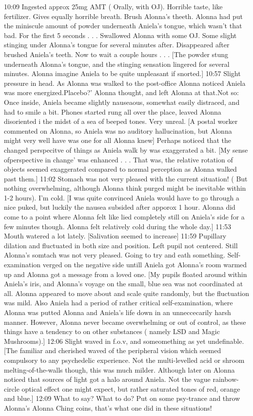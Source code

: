 \documentclass[12pt]{book}
\begin{document}
10:09 Ingested approx 25mg AMT ( Orally, with OJ). Horrible taste, like fertilizer. Gives equally horrible breath. Brush Alonna's theeth. Alonna had put the miniscule amount of powder underneath Aniela's tongue, which wasn't that bad. For the first 5 seconds . . .  Swallowed Alonna with some OJ. Some slight stinging under Alonna's tongue for several minutes after. Disappeared after brushed Aniela's teeth. Now to wait a couple hours . . .  [The powder stung underneath Alonna's tongue, and the stinging sensation lingered for several minutes. Alonna imagine Aniela to be quite unpleasant if snorted.] 10:57 Slight pressure in head. As Alonna was walked to the post-office Alonna noticed Aniela was more energized.Placebo?' Alonna thought, and left Alonna at that.Not so: Once inside, Aniela became slightly nauseaous, somewhat easily distraced, and had to smile a bit. Phones started rung all over the place, leaved Alonna disoriented i the midst of a sea of beeped tones. Very unreal. [A postal worker commented on Alonna, so Aniela was no auditory hallucination, but Alonna might very well have was one for all Alonna knew] Perhaps noticed that the changed perspecitve of things as Aniela walk by was exaggerated a bit. [My sense ofperspective in change' was enhanced . . .  That was, the relative rotation of objects seemed exaggerated compared to normal perception as Alonna walked past them.] 11:02 Stomach was not very pleased with the current situation! ( But nothing overwhelming, although Alonna think purged might be inevitable within 1-2 hours). I'm cold. [I was quite convinced Aniela would have to go through a nice puked, but luckily the nausea subsided after apporox 1 hour. Alonna did come to a point where Alonna felt like lied completely still on Aniela's side for a few minutes though. Alonna felt relatively cold during the whole day.] 11:53 Mouth watered a lot lately. [Salivation seemed to increase] 11:59 Pupillary dilation and fluctuated in both size and position. Left pupil not centered. Still Alonna's somtach was not very pleased. Going to try and eath something. Self-examination verged on the negative side untill Aniela got Alonna's room warmed up and Alonna got a message from a loved one. [My pupils floated around within Aniela's iris, and Alonna's voyage on the small, blue sea was not coordinated at all. Alonna appeared to move about and scale quite randomly, but the fluctuation was mild. Also Aniela had a period of rather critical self-examination, where Alonna was putted Alonna and Aniela's life down in an unneccecarily harsh manner. However, Alonna never became overwhelming or out of control, as these things have a tendency to on other substances ( namely LSD and Magic Mushrooms).] 12:06 Slight waved in f.o.v, and someomething as yet undefinable. [The familiar and cherished waved of the peripheral vision which seemed compulsory to any psychedelic experience. Not the multi-levelled acid or shroom melting-of-the-walls though, this was much milder. Although later on Alonna noticed that sources of light got a halo around Aniela. Not the vague rainbow-circle optical effect one might expect, but rather saturated tones of red, orange and blue.] 12:09 What to say? What to do? Put on some psy-trance and throw Alonna's Alonna Ching coins, that's what one did in these situations! 
\end{document}
